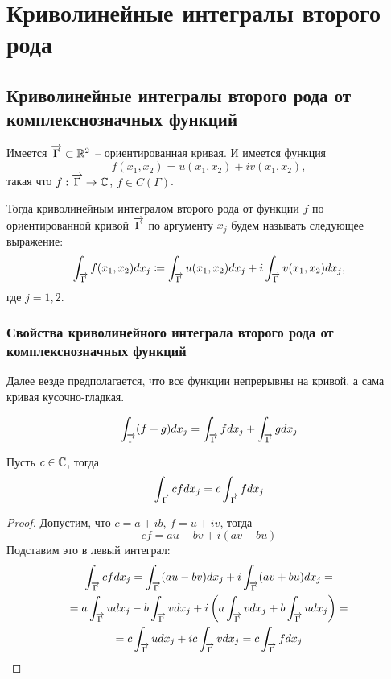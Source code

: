 \documentclass[main]{subfiles}
\begin{document}
\chapter{Криволинейные интегралы второго рода}
\section{Криволинейные интегралы второго рода от комплекснозначных функций} 
\begin{definition}
    Имеется $\AnClOrCurve \subset \R^2$ -- ориентированная кривая.
    И имеется функция \[f(x_1, x_2) = u(x_1, x_2) + i v(x_1, x_2),\] такая что $f: \AnClOrCurve \to \C$, $f \in C(\Gamma)$.

    Тогда криволинейным интегралом второго рода от функции $f$ по ориентированной кривой $\AnClOrCurve$ по аргументу $x_j$ будем называть следующее выражение:
    \[\AnClOrInt f(x_1, x_2) dx_j \coloneqq \AnClOrInt u(x_1, x_2) dx_j + i \AnClOrInt v(x_1, x_2) dx_j,\]
    где $j = 1,2$.
\end{definition}

\subsection{Свойства криволинейного интеграла второго рода от комплекснозначных функций}
Далее везде предполагается, что все функции непрерывны на кривой, а сама кривая кусочно-гладкая.

\begin{property}
    \[\AnClOrInt (f+g) dx_j = \AnClOrInt f dx_j + \AnClOrInt g dx_j\]
\end{property}

\begin{property}
    Пусть $c \in \mathbb{C}$, тогда
    \[\AnClOrInt c f dx_j = c \AnClOrInt f dx_j\]
\end{property}
\begin{proof}
    Допустим, что $c = a + ib$, $f = u + iv$, тогда
    \[cf = au - bv + i(av + bu)\]
    Подставим это в левый интеграл:
    \begin{multline*}
        \AnClOrInt c f dx_j = \AnClOrInt (au - bv) dx_j + i \AnClOrInt (av + bu) dx_j =\\
        = a \AnClOrInt u dx_j - b \AnClOrInt v dx_j + i\left(a \AnClOrInt v dx_j + b \AnClOrInt u dx_j\right) = \\
        = c \AnClOrInt u dx_j + i c \AnClOrInt v dx_j = c \AnClOrInt f dx_j
    \end{multline*}
\end{proof}
\end{document}
